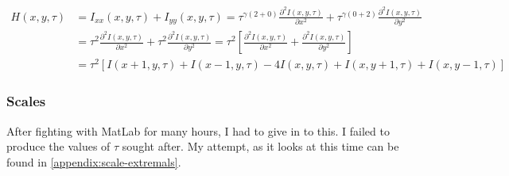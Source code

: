 \begin{align}
    H(x,y,\tau)
    &= I_{xx}(x,y,\tau) + I_{yy}(x,y,\tau)
     = \tau^{\gamma(2+0)} \frac{\partial^2 I(x,y,\tau)}{\partial x^2}
     + \tau^{\gamma(0+2)} \frac{\partial^2 I(x,y,\tau)}{\partial y^2} \\
    &= \tau^2 \frac{\partial^2 I(x,y,\tau)}{\partial x^2}
     + \tau^2 \frac{\partial^2 I(x,y,\tau)}{\partial y^2}
     = \tau^2 \left[ \frac{\partial^2 I(x,y,\tau)}{\partial x^2}
     + \frac{\partial^2 I(x,y,\tau)}{\partial y^2} \right] \\
    &= \tau^2 \left[
       I(x+1,y,\tau)
     + I(x-1,y,\tau)
     - 4 I(x,y,\tau)
     + I(x,y+1,\tau)
     + I(x,y-1,\tau)
       \right]
\end{align}

\subsubsection{Scales}
After fighting with MatLab for many hours, I had to give in to this. I failed
to produce the values of $\tau$ sought after. My attempt, as it looks at this
time can be found in \ref{appendix:scale-extremals}.


